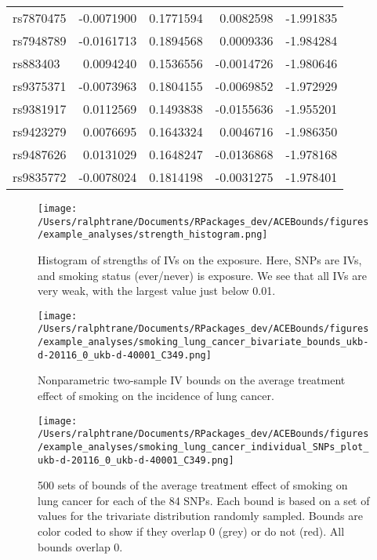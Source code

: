 \documentclass[
]{article}
\theoremstyle{plain}
\begin{document}
\begin{longtable}[t]{lrrrr}
rs7870475 & -0.0071900 & 0.1771594 & 0.0082598 & -1.991835\\
rs7948789 & -0.0161713 & 0.1894568 & 0.0009336 & -1.984284\\
rs883403 & 0.0094240 & 0.1536556 & -0.0014726 & -1.980646\\
rs9375371 & -0.0073963 & 0.1804155 & -0.0069852 & -1.972929\\
\addlinespace
rs9381917 & 0.0112569 & 0.1493838 & -0.0155636 & -1.955201\\
rs9423279 & 0.0076695 & 0.1643324 & 0.0046716 & -1.986350\\
rs9487626 & 0.0131029 & 0.1648247 & -0.0136868 & -1.978168\\
rs9835772 & -0.0078024 & 0.1814198 & -0.0031275 & -1.978401\\*
\end{longtable}

\begin{figure}[H]
 \center
 \texttt{[image: /Users/ralphtrane/Documents/RPackages\_dev/ACEBounds/figures/example\_analyses/strength\_histogram.png]}
 \caption{Histogram of strengths of IVs on the exposure. Here, SNPs are IVs, and smoking status (ever/never) is exposure. We see that all IVs are very weak, with the largest value just below 0.01.}
 \label{fig:strength_histogram}
\end{figure}

\begin{figure}[H]
  \texttt{[image: /Users/ralphtrane/Documents/RPackages\_dev/ACEBounds/figures/example\_analyses/smoking\_lung\_cancer\_bivariate\_bounds\_ukb-d-20116\_0\_ukb-d-40001\_C349.png]}
  \caption{Nonparametric two-sample IV bounds on the average treatment effect of smoking on the incidence of lung cancer.}
  \label{fig:smoking_on_lung_cancer_ind_bounds}
\end{figure}

\begin{figure}[H]
  \center
  \texttt{[image: /Users/ralphtrane/Documents/RPackages\_dev/ACEBounds/figures/example\_analyses/smoking\_lung\_cancer\_individual\_SNPs\_plot\_ukb-d-20116\_0\_ukb-d-40001\_C349.png]}
    \caption{500 sets of bounds of the average treatment effect of smoking on lung cancer for each of the 84 SNPs. Each bound is based on a set of values for the trivariate distribution randomly sampled. Bounds are color coded to show if they overlap 0 (grey) or do not (red). All bounds overlap 0.}
    \label{fig:smoking_on_lung_cancer_tri_bounds_all}
\end{figure}
\end{document}
